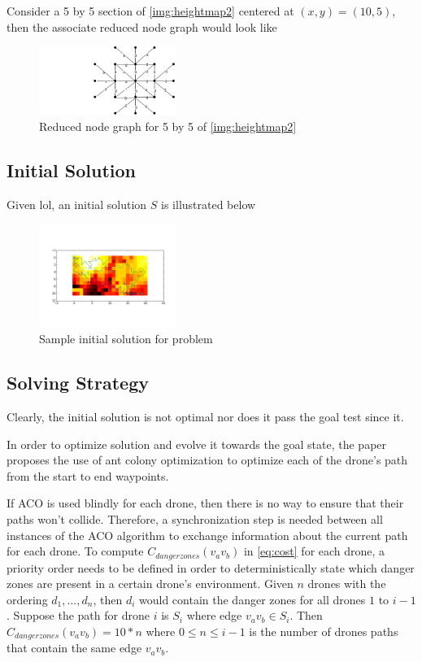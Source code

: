 \documentclass[conference]{IEEEtran}
\begin{document}
Consider a 5 by 5 section of \ref{img:heightmap2} centered at $(x, y) = (10, 5)$, then the associate reduced node graph would look like
\begin{figure}[htbp] \label{img:nodegraph5}
\centerline{\includegraphics[width=0.4\textwidth]{images/nodegraph5.png}}
\caption{Reduced node graph for 5 by 5 of \ref{img:heightmap2}}
\label{fig}
\end{figure}

\subsection{Initial Solution}
Given lol, an initial solution $S$ is illustrated below
\begin{figure}[htbp] \label{img:solution_aco}
\centerline{\includegraphics[width=0.4\textwidth]{images/solution_aco.png}}
\caption{Sample initial solution for problem}
\label{fig}
\end{figure}

\subsection{Solving Strategy}
Clearly, the initial solution is not optimal nor does it pass the goal test since it.

In order to optimize solution and evolve it towards the goal state, the paper proposes the use of ant colony optimization to optimize each of the drone's path from the start to end waypoints.

If ACO is used blindly for each drone, then there is no way to ensure that their paths won't collide. Therefore, a synchronization step is needed between all instances of the ACO algorithm to exchange information about the current path for each drone. To compute $C_{danger zones}(v_av_b)$ in \ref{eq:cost} for each drone, a priority order needs to be defined in order to deterministically state which danger zones are present in a certain drone's environment. Given $n$ drones with the ordering $d_1, ..., d_n$, then $d_i$ would contain the danger zones for all drones $1$ to $i-1$. Suppose the path for drone $i$ is $S_i$ where edge $v_av_b \in S_i$. Then $C_{danger zones}(v_av_b) = 10*n$ where $0 \leq n \leq i-1$ is the number of drones paths that contain the same edge $v_av_b$.
\end{document}
